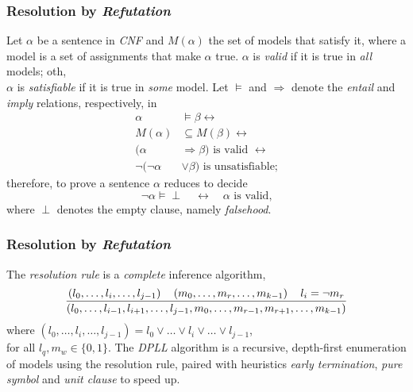 \documentclass[9pt]{beamer}
\begin{document}
\iffalse

\begin{frame}[fragile]

\frametitle{Resolution by \textit{Refutation}}

Let $\alpha$ be a sentence in \textit{CNF} and $M(\alpha)$ the set of models that
satisfy it, where a model is a set of assignments that make $\alpha$ true.
\vfill
$\alpha$ is \textit{valid} if it is true in \textit{all} models; oth,\\
$\alpha$ is \textit{satisfiable} if it is true in \textit{some} model.
\vfill
Let $\models$ and $\Rightarrow$ denote the \textit{entail} and \textit{imply} relations, respectively, in
\begin{displaymath}
\begin{split}
\alpha &\models \beta \leftrightarrow \\
M(\alpha) &\subseteq M(\beta) \leftrightarrow \\
(\alpha &\Rightarrow \beta) \text{ is valid } \leftrightarrow\\
\neg(\neg\alpha &\vee \beta) \text{ is unsatisfiable;}
\end{split}
\end{displaymath}
therefore, to prove a sentence $\alpha$ reduces to decide
$$\neg\alpha\models\perp\quad\leftrightarrow\quad\alpha\text{ is valid,}$$
where $\perp$ denotes the empty clause, namely \textit{falsehood}.
\end{frame}

\begin{frame}[fragile]
\frametitle{Resolution by \textit{Refutation}}
The \textit{resolution rule} is a \textit{complete} inference algorithm,
\begin{displaymath}
{\left(l_{0}, \ldots, l_{i}, \ldots, l_{j-1}\right) \quad \left(m_{0}, \ldots, m_{r},\ldots, m_{k-1}\right) \quad l_{i} = \neg m_{r}
\over
\left(l_{0},\ldots, l_{i-1},l_{i+1}, \ldots,l_{j-1}, m_{0},\ldots, m_{r-1},m_{r+1},\ldots, m_{k-1}\right)}
\end{displaymath}
where $\left(l_{0},\ldots, l_{i}, \ldots, l_{j-1}\right) = l_{0}\vee \ldots
\vee l_{i} \vee \ldots \vee l_{j-1}$, \\
for all $l_{q}, m_{w} \in\lbrace 0,1\rbrace$.
\vfill
The \textit{DPLL} algorithm is a recursive, depth-first enumeration of models
using the resolution rule, paired with heuristics \textit{early termination},
\textit{pure symbol} and \textit{unit clause} to speed up.
\end{frame}
\end{document}
